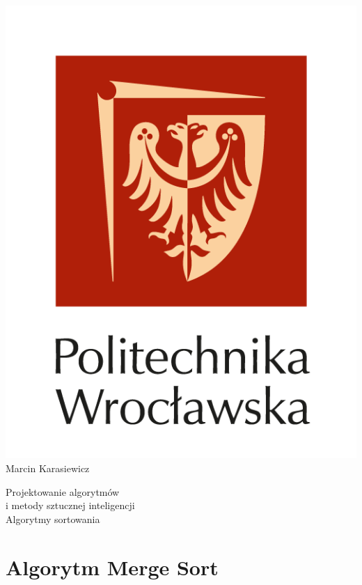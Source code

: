 \documentclass[12pt]{article}
\begin{document}
 
\begin{titlepage}
\begin{center}
\includegraphics[scale=1.0]{./Pwr_logo/logo_PWr_2.png}
\\
\vspace{1.5cm}
{\Huge Marcin Karasiewicz}
\\
\begin{Large}
\vspace{1.0cm}
Projektowanie algorytmów \\ i metody sztucznej inteligencji \\
\vspace{1.0cm}
Algorytmy sortowania
\end{Large}
\end{center}
\newpage
\tableofcontents 

\end{titlepage}
\newpage
 
\section{Algorytm Merge Sort }
\end{document}
